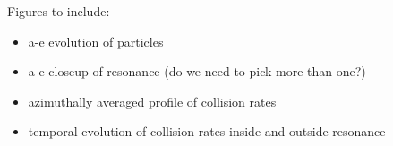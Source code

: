 \documentclass[twocolumn]{aastex63}
\begin{document}








Figures to include:

\begin{itemize}
    \item a-e evolution of particles
    \item a-e closeup of resonance (do we need to pick more than one?)
    \item azimuthally averaged profile of collision rates
    \item temporal evolution of collision rates inside and outside resonance
\end{itemize}
\end{document}
